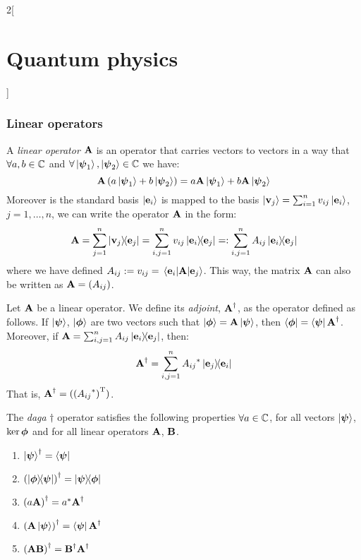 \documentclass[../../../main.tex]{subfiles}
\begin{document}
\begin{multicols}{2}[\section{Quantum physics}]
  \subsubsection{Linear operators}
  \begin{definition}
    A \emph{linear operator} $\boldsymbol{\mathrm{A}}$ is an operator that carries vectors to vectors in a way that $\forall a,b\in\mathbb{C}$ and $\forall \ket{\boldsymbol{\mathrm{\psi}}_1},\ket{\boldsymbol{\mathrm{\psi}}_2}\in \mathbb{C}$ we have: $$\boldsymbol{\mathrm{A}}\left(a\ket{\boldsymbol{\mathrm{\psi}}_1}+b\ket{\boldsymbol{\mathrm{\psi}}_2}\right)=a\boldsymbol{\mathrm{A}}\ket{\boldsymbol{\mathrm{\psi}}_1}+b\boldsymbol{\mathrm{A}}\ket{\boldsymbol{\mathrm{\psi}}_2}$$
    Moreover is the standard basis $\ket{\boldsymbol{\mathrm{e}}_i}$ is mapped to the basis $\ket{\boldsymbol{\mathrm{v}}_j}=\sum_{i=1}^nv_{ij}\ket{\boldsymbol{\mathrm{e}}_i}$, $j=1,\ldots,n$, we can write the operator $\boldsymbol{\mathrm{A}}$ in the form: $$\vf{A}=\sum_{j=1}^n\dyad{\vf{v}_j}{\vf{e}_j}=\sum_{i,j=1}^nv_{ij}\dyad{\vf{e}_i}{\vf{e}_j}=:\sum_{i,j=1}^nA_{ij}\dyad{\vf{e}_i}{\vf{e}_j}$$ where we have defined $A_{ij}:=v_{ij}=\mel{\boldsymbol{\mathrm{e}}_i}{\boldsymbol{\mathrm{A}}}{\boldsymbol{\mathrm{e}}_j}$. This way, the matrix $\boldsymbol{\mathrm{A}}$ can also be written as $\boldsymbol{\mathrm{A}}=(A_{ij})$.
  \end{definition}
  \begin{definition}
    Let $\boldsymbol{\mathrm{A}}$ be a linear operator. We define its \emph{adjoint}, $\boldsymbol{\mathrm{A}}^\dag$, as the operator defined as follows. If $\ket{\boldsymbol{\mathrm{\psi}}}$, $\ket{\boldsymbol{\mathrm{\phi}}}$ are two vectors such that $\ket{\boldsymbol{\mathrm{\phi}}}=\boldsymbol{\mathrm{A}}\ket{\boldsymbol{\mathrm{\psi}}}$, then $\bra{\boldsymbol{\mathrm{\phi}}}=\bra{\boldsymbol{\mathrm{\psi}}}\boldsymbol{\mathrm{A}}^\dag$. Moreover, if $\vf{A}=\sum_{i,j=1}^nA_{ij}\dyad{\vf{e}_i}{\vf{e}_j}$, then: $$\vf{A}^\dag=\sum_{i,j=1}^n{A_{ij}}^*\dyad{\vf{e}_j}{\vf{e}_i}$$ That is, $\boldsymbol{\mathrm{A}}^\dag=({({A_{ij}}^*)}^{\mathrm{T}})$.
  \end{definition}
  \begin{proposition}
    The \emph{daga} $\dag$ operator satisfies the following properties $\forall a\in\mathbb{C}$, for all vectors $\ket{\boldsymbol{\mathrm{\psi}}}$, $\ker{\boldsymbol{\mathrm{\phi}}}$ and for all linear operators $\boldsymbol{\mathrm{A}}$, $\boldsymbol{\mathrm{B}}$.
    \begin{enumerate}
      \item ${\ket{\boldsymbol{\mathrm{\psi}}}}^\dag=\bra{\boldsymbol{\mathrm{\psi}}}$
      \item ${(\dyad{\vf\phi}{\vf\psi})}^\dag=\dyad{\vf\psi}{\vf\phi}$
      \item ${(a\boldsymbol{\mathrm{A}})}^\dag=a^*\boldsymbol{\mathrm{A}}^\dag$
      \item ${(\boldsymbol{\mathrm{A}}\ket{\boldsymbol{\mathrm{\psi}}})}^\dag=\bra{\boldsymbol{\mathrm{\psi}}}\boldsymbol{\mathrm{A}}^\dag$
      \item ${(\boldsymbol{\mathrm{AB}})}^\dag=\boldsymbol{\mathrm{B}}^\dag\boldsymbol{\mathrm{A}}^\dag$
    \end{enumerate}
  \end{proposition}
  \begin{definition}

\end{definition}
\end{multicols}
\end{document}

